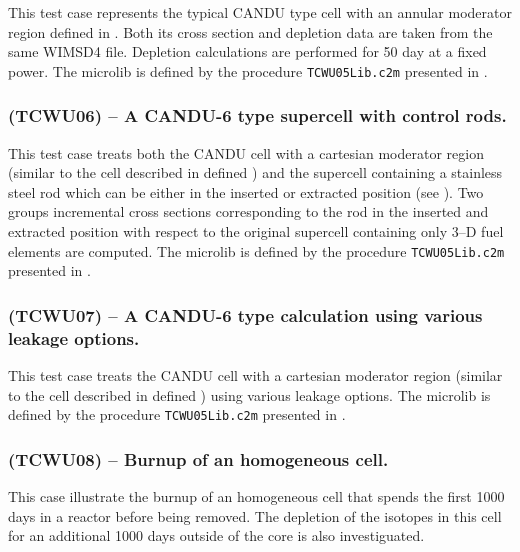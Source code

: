 This test case represents the typical CANDU type cell with an annular moderator
region defined in . Both its cross section and depletion data are
taken from the same WIMSD4 file. Depletion calculations are performed for 50 day at
a fixed power.\cite{Mtl93b} The {\sc microlib} is defined by the procedure
{\tt TCWU05Lib.c2m} presented in .


\subsubsection{\tst(TCWU06) -- A CANDU-6 type supercell with control rods.}

This test case treats both the CANDU cell with a cartesian moderator region
(similar to the cell described in defined ) and the
supercell containing a stainless steel rod which can be either in the inserted
or extracted position (see ). Two groups incremental cross sections
corresponding to the rod in the inserted and extracted position with respect to
the original supercell containing only 3--D fuel elements are computed.\cite{Mtl93b}
The {\sc microlib} is defined by the procedure {\tt TCWU05Lib.c2m} presented in .



\subsubsection{\tst(TCWU07) -- A CANDU-6 type calculation using various leakage
options.}

This test case treats the CANDU cell with a cartesian moderator region
(similar to the cell described in defined ) using various leakage
options. The {\sc microlib} is defined by the procedure {\tt TCWU05Lib.c2m} presented in .



\subsubsection{\tst(TCWU08) -- Burnup of an homogeneous cell.}

This case illustrate the burnup of an homogeneous cell that spends the first
1000 days in a reactor before being removed. The depletion of the isotopes in
this cell for an additional 1000 days outside of the core is also investiguated.

